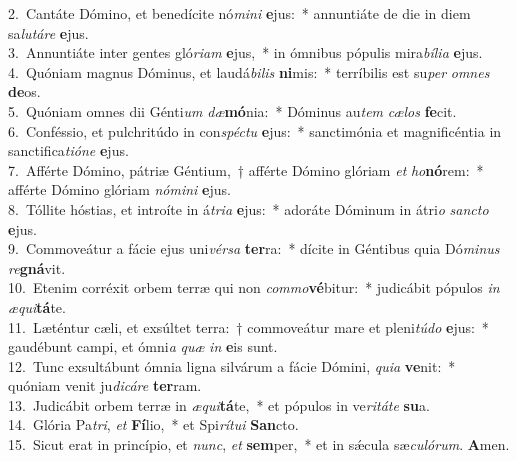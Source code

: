 {2.~}Cantáte Dómino, et benedícite nó\textit{mi}\textit{ni} \textbf{e}jus:~* annuntiáte de die in diem sa\textit{lu}\textit{tá}\textit{re} \textbf{e}jus.\\
{3.~}Annuntiáte inter gentes gló\textit{ri}\textit{am} \textbf{e}jus,~* in ómnibus pópulis mira\textit{bí}\textit{li}\textit{a} \textbf{e}jus.\\
{4.~}Quóniam magnus Dóminus, et laudá\textit{bi}\textit{lis} \textbf{ni}mis:~* terríbilis est su\textit{per} \textit{om}\textit{nes} \textbf{de}os.\\
{5.~}Quóniam omnes dii Génti\textit{um} \textit{dæ}\textbf{mó}nia:~* Dóminus au\textit{tem} \textit{cæ}\textit{los} \textbf{fe}cit.\\
{6.~}Conféssio, et pulchritúdo in con\textit{spé}\textit{ctu} \textbf{e}jus:~* sanctimónia et magnificéntia in sanctifica\textit{ti}\textit{ó}\textit{ne} \textbf{e}jus.\\
{7.~}Afférte Dómino, pátriæ Géntium,~† afférte Dómino glóriam \textit{et} \textit{ho}\textbf{nó}rem:~* afférte Dómino glóriam \textit{nó}\textit{mi}\textit{ni} \textbf{e}jus.\\
{8.~}Tóllite hóstias, et introíte in á\textit{tri}\textit{a} \textbf{e}jus:~* adoráte Dóminum in átri\textit{o} \textit{san}\textit{cto} \textbf{e}jus.\\
{9.~}Commoveátur a fácie ejus uni\textit{vér}\textit{sa} \textbf{ter}ra:~* dícite in Géntibus quia Dó\textit{mi}\textit{nus} \textit{re}\textbf{gná}vit.\\
{10.~}Etenim corréxit orbem terræ qui non \textit{com}\textit{mo}\textbf{vé}bitur:~* judicábit pópulos \textit{in} \textit{æ}\textit{qui}\textbf{tá}te.\\
{11.~}Læténtur cæli, et exsúltet terra:~† commoveátur mare et pleni\textit{tú}\textit{do} \textbf{e}jus:~* gaudébunt campi, et ómni\textit{a} \textit{quæ} \textit{in} \textbf{e}is sunt.\\
{12.~}Tunc exsultábunt ómnia ligna silvárum a fácie Dómini, \textit{qui}\textit{a} \textbf{ve}nit:~* quóniam venit ju\textit{di}\textit{cá}\textit{re} \textbf{ter}ram.\\
{13.~}Judicábit orbem terræ in \textit{æ}\textit{qui}\textbf{tá}te,~* et pópulos in ve\textit{ri}\textit{tá}\textit{te} \textbf{su}a.\\
{14.~}Glória Pa\textit{tri}, \textit{et} \textbf{Fí}lio,~* et Spi\textit{rí}\textit{tu}\textit{i} \textbf{San}cto.\\
{15.~}Sicut erat in princípio, et \textit{nunc}, \textit{et} \textbf{sem}per,~* et in sǽcula sæ\textit{cu}\textit{ló}\textit{rum}. \textbf{A}men.\\
